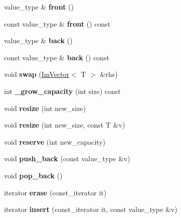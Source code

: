 \begin{DoxyCompactItemize}
value\+\_\+type \& {\bfseries front} ()
\item 
\mbox{\label{class_im_vector_a76dc6bb045574ba79b15a1941b662597}} 
const value\+\_\+type \& {\bfseries front} () const
\item 
\mbox{\label{class_im_vector_a3e4424d3fca190894598a6575f9d2401}} 
value\+\_\+type \& {\bfseries back} ()
\item 
\mbox{\label{class_im_vector_a6f22918d4f139a1c4c3410ccae726f81}} 
const value\+\_\+type \& {\bfseries back} () const
\item 
\mbox{\label{class_im_vector_afcec0d2a1e28aebe412b6efd06f0a77a}} 
void {\bfseries swap} (\hyperlink{class_im_vector}{Im\+Vector}$<$ T $>$ \&rhs)
\item 
\mbox{\label{class_im_vector_af9dfc79dfd89c904830bebc492a18310}} 
int {\bfseries \+\_\+grow\+\_\+capacity} (int size) const
\item 
\mbox{\label{class_im_vector_ac371dd62e56ae486b1a5038cf07eee56}} 
void {\bfseries resize} (int new\+\_\+size)
\item 
\mbox{\label{class_im_vector_abe7f21776ecfb7d0214963fd8c0689f0}} 
void {\bfseries resize} (int new\+\_\+size, const T \&v)
\item 
\mbox{\label{class_im_vector_a0f14f5736c3372157856eebb67123b75}} 
void {\bfseries reserve} (int new\+\_\+capacity)
\item 
\mbox{\label{class_im_vector_a68387993f2a5f5c3b2a7139d9ab778b8}} 
void {\bfseries push\+\_\+back} (const value\+\_\+type \&v)
\item 
\mbox{\label{class_im_vector_a3db7ce62d3c429effdb893fbf7148c1c}} 
void {\bfseries pop\+\_\+back} ()
\item 
\mbox{\label{class_im_vector_a1e1fd9b678be9d4b4432fbefde976045}} 
iterator {\bfseries erase} (const\+\_\+iterator it)
\item 
\mbox{\label{class_im_vector_a52fdb731c13c82a1fd971186c6a701b5}} 
iterator {\bfseries insert} (const\+\_\+iterator it, const value\+\_\+type \&v)
\end{DoxyCompactItemize}

